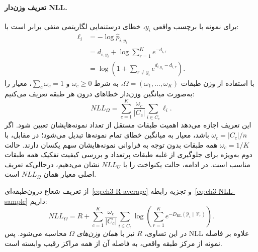 \paragraph{تعریف وزن‌دار NLL.}
برای نمونه با برچسب واقعی $y_i$، خطای درستنمایی لگاریتمی منفی برابر است با:
\begin{equation}\label{eq:ch3-NLL-sample}
\begin{aligned}
\ell_i
&=-\log\widehat p_{i,y_i}\\
&=d_{i,y_i}+\log\sum_{r=1}^{K}e^{-d_{i,r}}\\
&=\log\left(1+\sum_{r\ne y_i}e^{d_{i,y_i}-d_{i,r}}\right).
\end{aligned}
\end{equation}
با استفاده از وزن طبقات $\Omega=(\omega_1,\ldots,\omega_K)$، به شرط $\omega_c\ge0$ و $\sum_c\omega_c=1$، معیار را به‌صورت میانگین وزن‌دار خطاهای درون هر طبقه تعریف می‌کنیم:
\begin{equation}\label{eq:ch3-NLL-balanced}
\boxed{
NLL_{\Omega}=\sum_{c=1}^{K}\frac{\omega_c}{|C_c|}
\sum_{i\in C_c}\ell_i.}
\end{equation}
این تعریف اجازه می‌دهد اهمیت طبقات مستقل از تعداد نمونه‌هایشان تعیین شود. اگر $\omega_c=|C_c|/n$ باشد، معیار به میانگین خطای تمام نمونه‌ها تبدیل می‌شود؛ در مقابل، با $\omega_c=1/K$ همه طبقات بدون توجه به فراوانی نمونه‌هایشان سهم یکسان دارند. حالت دوم به‌ویژه برای جلوگیری از غلبه طبقات پرتعداد و بررسی کیفیت تفکیک همه طبقات مناسب است. در ادامه، حالت یکنواخت را با $NLL_U$ نشان می‌دهیم، درحالی‌که تعریف اصلی معیار همان $NLL_\Omega$ است.

از تعریف شعاع درون‌طبقه‌ای~\eqref{eq:ch3-R-average} و تجزیه رابطه~\eqref{eq:ch3-NLL-sample} داریم:
\begin{equation}\label{eq:ch3-NLL-R}
NLL_\Omega=R+
\sum_{c=1}^{K}\frac{\omega_c}{|C_c|}\sum_{i\in C_c}
\log\left(\sum_{r=1}^{K}
e^{-D_{\mathrm{KL}}(\mathscr Y_i\|\mathcal V_r)}\right).
\end{equation}
در این تساوی، $R$ نیز با \emph{همان وزن‌های} $\Omega$ محاسبه می‌شود. پس NLL علاوه بر فاصله نمونه از مرکز طبقه واقعی، به فاصله آن از همه مراکز رقیب وابسته است.

